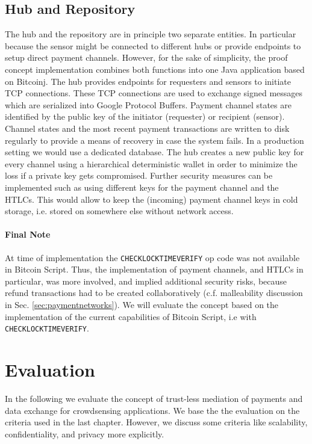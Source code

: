 \subsection{Hub and Repository}
The hub and the repository are in principle two separate entities. In particular because the sensor might be connected to different hubs or provide endpoints to setup direct payment channels. However, for the sake of simplicity, the proof concept implementation combines both functions into one Java application based on Bitcoinj. The hub provides endpoints for requesters and sensors to initiate \ac{TCP} connections. These \ac{TCP} connections are used to exchange signed messages which are serialized into Google Protocol Buffers. Payment channel states are identified by the public key of the initiator (requester) or recipient (sensor). Channel states and the most recent payment transactions are written to disk regularly to provide a means of recovery in case the system fails. In a production setting we would use a dedicated database. 
The hub creates a new public key for every channel using a hierarchical deterministic wallet \parencite{bip32} in order to minimize the loss if a private key gets compromised. Further security measures can be implemented such as using different keys for the payment channel and the \ac{HTLC}s. This would allow to keep the (incoming) payment channel keys in cold storage, i.e. stored on somewhere else without network access.
 
\paragraph{Final Note} At time of implementation the \texttt{CHECKLOCKTIMEVERIFY} op code \parencite{bip65} was not available in Bitcoin Script. Thus, the implementation of payment channels, and \ac{HTLC}s in particular, was more involved, and implied additional security risks, because refund transactions had to be created collaboratively (c.f. malleability discussion in Sec. \ref{sec:paymentnetworks}). We will evaluate the concept based on the implementation of the current capabilities of Bitcoin Script, i.e with \texttt{CHECKLOCKTIMEVERIFY}.

\section{Evaluation}
\label{sec:trustlessevaluation}

In the following we evaluate the concept of trust-less mediation of payments and data exchange for crowdsensing applications. We base the the evaluation on the criteria used in the last chapter. However, we discuss some criteria like scalability, confidentiality, and privacy more explicitly.  

